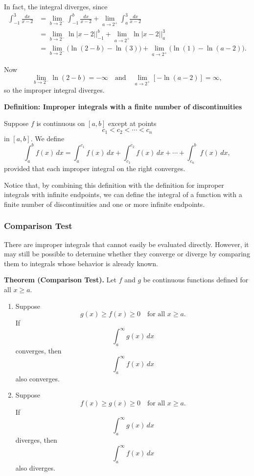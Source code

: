 In fact, the integral diverges, since
\begin{align}
\int_{-1}^3 \frac{dx}{x-2}
&= \lim_{b\to 2^-}\int_{-1}^b \frac{dx}{x-2}
 + \lim_{a\to 2^+}\int_a^3 \frac{dx}{x-2} \\
&= \lim_{b\to 2^-}\ln|x-2|\Big|_{-1}^b
 + \lim_{a\to 2^+}\ln|x-2|\Big|_a^3 \\
&= \lim_{b\to 2^-}\bigl(\ln(2-b)-\ln(3)\bigr)
 + \lim_{a\to 2^+}\bigl(\ln(1)-\ln(a-2)\bigr).
\end{align}

Now
\[
\lim_{b\to 2^-}\ln(2-b) = -\infty
\quad\text{and}\quad
\lim_{a\to 2^+}[-\ln(a-2)] = \infty,
\]
so the improper integral diverges.

\medskip

\textbf{Definition: Improper integrals with a finite number of discontinuities}

Suppose $f$ is continuous on $[a,b]$ except at points
\[
c_1<c_2<\cdots<c_n
\]
in $[a,b]$. We define
\[
\int_a^b f(x)\,dx
=
\int_a^{c_1} f(x)\,dx
+\int_{c_1}^{c_2} f(x)\,dx
+\cdots
+\int_{c_n}^b f(x)\,dx,
\]
provided that each improper integral on the right converges.

Notice that, by combining this definition with the definition for improper integrals with infinite endpoints, we can define the integral of a function with a finite number of discontinuities and one or more infinite endpoints.

\subsubsection{Comparison Test}
\label{sss:comp-edc1}

There are improper integrals that cannot easily be evaluated directly. However, it may still be possible to determine whether they converge or diverge by comparing them to integrals whose behavior is already known.

\medskip

\textbf{Theorem (Comparison Test).} Let $f$ and $g$ be continuous functions defined for all $x\ge a$.

\begin{enumerate}
\item Suppose
\[
g(x)\ge f(x)\ge 0
\quad\text{for all } x\ge a.
\]
If
\[
\int_a^\infty g(x)\,dx
\]
converges, then
\[
\int_a^\infty f(x)\,dx
\]
also converges.

\item Suppose
\[
f(x)\ge g(x)\ge 0
\quad\text{for all } x\ge a.
\]
If
\[
\int_a^\infty g(x)\,dx
\]
diverges, then
\[
\int_a^\infty f(x)\,dx
\]
also diverges.
\end{enumerate}

